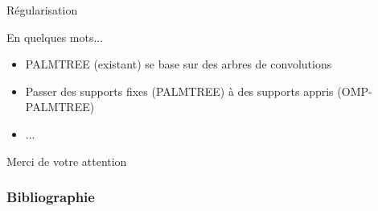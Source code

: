 \begin{frame}{Régularisation}
\end{frame}


\begin{frame}{En quelques mots...}
\begin{itemize}
\item PALMTREE (existant) se base sur des arbres de convolutions
\item Passer des supports fixes (PALMTREE) à des supports appris (OMP-PALMTREE)
\item ...
\end{itemize}
\vfill
\hfill Merci de votre attention
\end{frame}

\appendix

\begin{frame}
\frametitle{Bibliographie}
\printbibliography[heading=none]
\end{frame}


